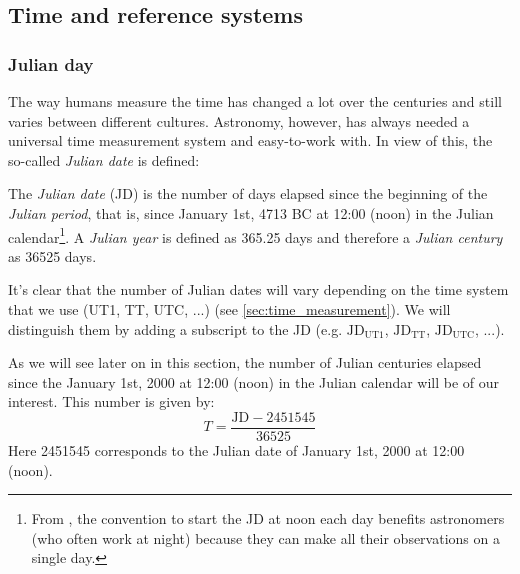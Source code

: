 \documentclass[../main.tex]{subfiles}
\begin{document}
\subsection{Time and reference systems}
\subsubsection{Julian day}\label{sec:julian_day}
The way humans measure the time has changed a lot over the centuries and still varies between different cultures. Astronomy, however, has always needed a universal time measurement system and easy-to-work with. In view of this, the so-called \emph{Julian date} is defined:
\begin{definition}
  The \emph{Julian date} (JD) is the number of days elapsed since the beginning of the \emph{Julian period}, that is, since January 1st, 4713 BC at 12:00 (noon) in the Julian calendar\footnote{From \cite{vallado}, the convention to start the JD at noon each day benefits astronomers (who often work at night) because they can make all their observations on a single day.}. A \emph{Julian year} is defined as 365.25 days and therefore a \emph{Julian century} as 36525 days.
\end{definition}
It's clear that the number of Julian dates will vary depending on the time system that we use (UT1, TT, UTC, ...) (see \cref{sec:time_measurement}). We will distinguish them by adding a subscript to the JD (e.g. $\text{JD}_\mathrm{UT1}$, $\text{JD}_\mathrm{TT}$, $\text{JD}_\mathrm{UTC}$, ...).

As we will see later on in this section, the number of Julian centuries elapsed since the January 1st, 2000 at 12:00 (noon) in the Julian calendar will be of our interest. This number is given by:
\begin{equation}
  T = \frac{\text{JD}-2451545}{36525}
\end{equation}
Here 2451545 corresponds to the Julian date of January 1st, 2000 at 12:00 (noon).
\end{document}
